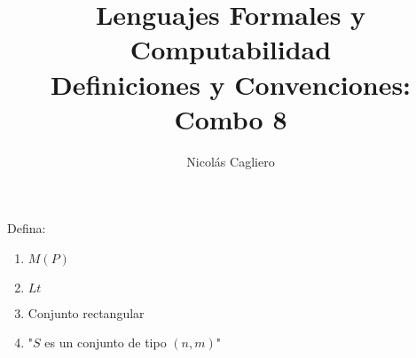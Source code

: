 \documentclass{article}
\title{Lenguajes Formales y Computabilidad \\
        \large Definiciones y Convenciones: Combo 8 }
\author{Nicolás Cagliero}
\begin{document}
\maketitle

Defina:

\begin{enumerate}
    \item $M(P)$

    \item $Lt$
    
    \item Conjunto rectangular
    
    \item "$S$ es un conjunto de tipo $(n, m)$"
\end{enumerate}
\end{document}
